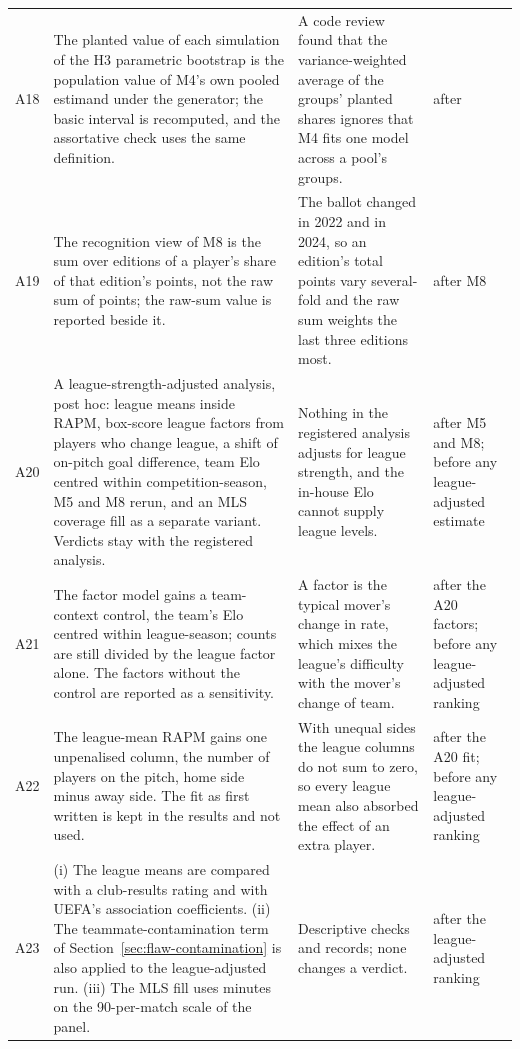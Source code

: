 \documentclass[11pt,a4paper]{article}
\begin{document}
{\begin{longtable}{@{}L{0.7cm}L{6.9cm}L{4.6cm}L{2.1cm}@{}}
A18 & The planted value of each simulation of the H3 parametric bootstrap is the population value of M4's own pooled estimand under the generator; the basic interval is recomputed, and the assortative check uses the same definition. & A code review found that the variance-weighted average of the groups' planted shares ignores that M4 fits one model across a pool's groups. & after \\
A19 & The recognition view of M8 is the sum over editions of a player's share of that edition's points, not the raw sum of points; the raw-sum value is reported beside it. & The ballot changed in 2022 and in 2024, so an edition's total points vary several-fold and the raw sum weights the last three editions most. & after M8 \\
A20 & A league-strength-adjusted analysis, post hoc: league means inside RAPM, box-score league factors from players who change league, a shift of on-pitch goal difference, team Elo centred within competition-season, M5 and M8 rerun, and an MLS coverage fill as a separate variant. Verdicts stay with the registered analysis. & Nothing in the registered analysis adjusts for league strength, and the in-house Elo cannot supply league levels. & after M5 and M8; before any league-adjusted estimate \\
A21 & The factor model gains a team-context control, the team's Elo centred within league-season; counts are still divided by the league factor alone. The factors without the control are reported as a sensitivity. & A factor is the typical mover's change in rate, which mixes the league's difficulty with the mover's change of team. & after the A20 factors; before any league-adjusted ranking \\
A22 & The league-mean RAPM gains one unpenalised column, the number of players on the pitch, home side minus away side. The fit as first written is kept in the results and not used. & With unequal sides the league columns do not sum to zero, so every league mean also absorbed the effect of an extra player. & after the A20 fit; before any league-adjusted ranking \\
A23 & (i) The league means are compared with a club-results rating and with UEFA's association coefficients. (ii) The teammate-contamination term of Section~\ref{sec:flaw-contamination} is also applied to the league-adjusted run. (iii) The MLS fill uses minutes on the 90-per-match scale of the panel. & Descriptive checks and records; none changes a verdict. & after the league-adjusted ranking \\

\end{longtable}}
\end{document}
